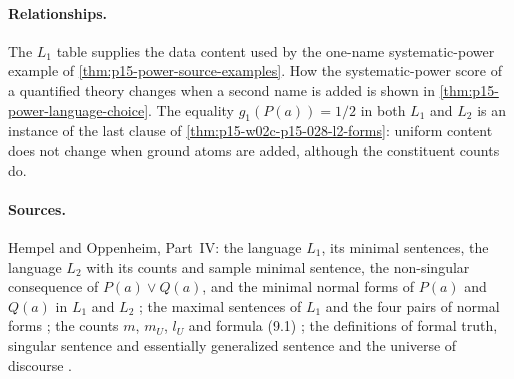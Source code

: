 \paragraph{Relationships.}
The \(L_1\) table supplies the data content used by the one-name
systematic-power example of \cref{thm:p15-power-source-examples}.
How the systematic-power score of a quantified theory changes when a
second name is added is shown in \cref{thm:p15-power-language-choice}.
The equality \(g_1(P(a))=1/2\) in both \(L_1\) and \(L_2\) is an
instance of the last clause of \cref{thm:p15-w02c-p15-028-l2-forms}:
uniform content does not change when ground atoms are added, although
the constituent counts do.

\paragraph{Sources.}
Hempel and Oppenheim, Part~IV: the language \(L_1\), its minimal
sentences, the language \(L_2\) with its counts and sample minimal
sentence, the non-singular consequence of \(P(a)\lor Q(a)\), and the
minimal normal forms of \(P(a)\) and \(Q(a)\) in \(L_1\) and \(L_2\)
\cite[p.~166]{HempelOppenheim1948Explanation}; the maximal sentences
of \(L_1\) and the four pairs of normal forms
\cite[p.~168]{HempelOppenheim1948Explanation}; the counts \(m\),
\(m_U\), \(l_U\) and formula (9.1)
\cite[p.~169]{HempelOppenheim1948Explanation}; the definitions of
formal truth, singular sentence and essentially generalized sentence
and the universe of discourse
\cite[p.~158]{HempelOppenheim1948Explanation}.
